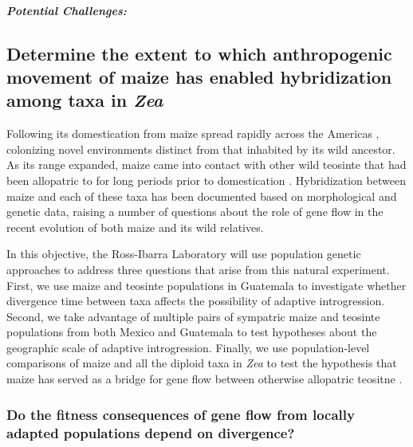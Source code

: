 \paragraph{\emph{Potential Challenges:}}


\subsection{Determine the extent to which anthropogenic movement of maize has enabled hybridization among taxa in \emph{Zea}} \label{ss:genuswide}

Following its domestication from \zp{} maize spread rapidly across the Americas \citep{Piperno2001,Grobman2012}, colonizing novel environments distinct from that inhabited by its wild ancestor. 
As its range expanded, maize came into contact with other wild teosinte that had been allopatric to \zp{} for    long periods prior to domestication \citep{hufford2012inferences}.  
Hybridization between maize and each of these taxa has been documented based on morphological \citep{wilkes1967teosinte, Wilkes1977} and genetic \citep{doebley1990molecular,Fukunaga2005,Ross-Ibarra2009a,vanheerwaarden2011a} data, raising a number of questions about the role of gene flow in the recent evolution of both maize and its wild relatives.

In this objective, the Ross-Ibarra Laboratory will use population genetic approaches to address three questions that arise from this natural experiment.  
First, we use maize and teosinte populations in Guatemala to investigate whether divergence time between taxa affects the possibility of adaptive introgression. 
Second, we take advantage of multiple pairs of sympatric maize and teosinte populations from both Mexico and Guatemala to test hypotheses about the geographic scale of adaptive introgression.
Finally, we use population-level comparisons of maize and all the diploid taxa in \emph{Zea} to test the hypothesis that maize has served as a bridge for gene flow between otherwise allopatric teositne \citep{Ross-Ibarra2009a}.

\subsubsection{Do the fitness consequences of gene flow from locally adapted populations depend on divergence?}
\label{sss:adaptive_intro}

